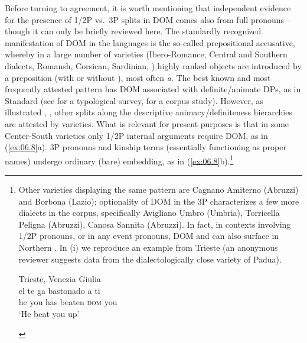 \documentclass[output=paper]{langsci/langscibook}
\begin{document}
Before turning to agreement, it is worth mentioning that independent evidence
for the presence of 1/2P vs.\ 3P splits in  \gls{DOM} comes also from
full pronouns – though it can only be briefly reviewed here. The standardly
recognized manifestation of \gls{DOM} in the  languages is the so-called
prepositional accusative, whereby in a large number of  varieties
(Ibero-Romance, Central and Southern  dialects, Romansh, Corsican,
Sardinian, ) highly ranked objects are introduced by a preposition
(with or without ), most often \emph{a}. The best known and most
frequently attested pattern has \gls{DOM} associated with definite/animate DPs,
as in Standard  (see \citealt{Aissen2003} for a typological survey,
\citealt{vHeuKai2011} for a corpus study). However, as illustrated
\textcite[§4.9]{ManziniSavoia2005}, \citet{DAlessandro2015}, other splits along the
descriptive animacy/definiteness hierarchies are attested by  varieties.
What is relevant for present purposes is that in some Center-South 
varieties only 1/2P internal arguments require DOM, as in (\ref{ex:06.8}a).
3P pronouns and kinship terms (essentially functioning as proper names) undergo
ordinary (bare) embedding, as in (\ref{ex:06.8}b).\footnote{Other varieties
    displaying the same pattern are Cagnano Amiterno (Abruzzi) and Borbona
    (Lazio); optionality of \gls{DOM} in the 3P characterizes a few more
    dialects in the corpus, specifically Avigliano Umbro (Umbria), Torricella
    Peligna (Abruzzi), Canosa Sannita (Abruzzi).  In fact, in contexts
    involving 1/2P pronouns, or in any event pronouns, DOM and 
    can also surface in Northern .  In (i) we reproduce an example from
    Trieste (an anonymous reviewer suggests data from the dialectologically
    close variety of Padua).

\begin{exe}
     Trieste, Venezia Giulia \parencite[548]{Ursini1988}\\
    \gll    el   te   ga bastonado   a ti\\
            he   you   has beaten \textsc{dom} you\\
    \glt    ‘He beat you up’
\end{exe}\label{fn:06.4}}
\end{document}
